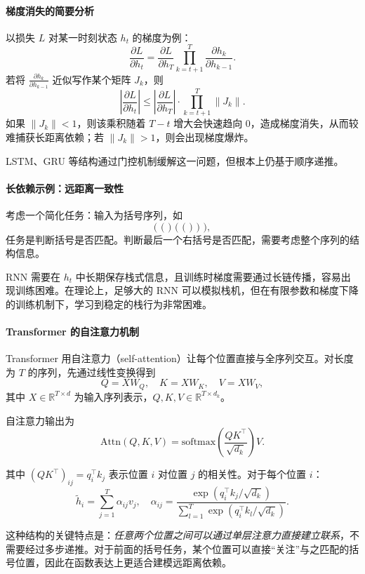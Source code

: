 \paragraph{梯度消失的简要分析}

以损失 $L$ 对某一时刻状态 $h_t$ 的梯度为例：
\[
\frac{\partial L}{\partial h_t} = \frac{\partial L}{\partial h_T} \prod_{k=t+1}^{T} \frac{\partial h_k}{\partial h_{k-1}}.
\]
若将 $\frac{\partial h_k}{\partial h_{k-1}}$ 近似写作某个矩阵 $J_k$，则
\[
\left|\frac{\partial L}{\partial h_t}\right| \le \left|\frac{\partial L}{\partial h_T}\right| \cdot \prod_{k=t+1}^{T} \|J_k\|.
\]
如果 $\|J_k\| < 1$，则该乘积随着 $T-t$ 增大会快速趋向 0，造成梯度消失，从而较难捕获长距离依赖；若 $\|J_k\| > 1$，则会出现梯度爆炸。

LSTM、GRU 等结构通过门控机制缓解这一问题，但根本上仍基于顺序递推。

\paragraph{长依赖示例：远距离一致性}

考虑一个简化任务：输入为括号序列，如
\[
\texttt{( ( ) ( ( ) ) )},
\]
任务是判断括号是否匹配。判断最后一个右括号是否匹配，需要考虑整个序列的结构信息。

RNN 需要在 $h_t$ 中长期保存栈式信息，且训练时梯度需要通过长链传播，容易出现训练困难。在理论上，足够大的 RNN 可以模拟栈机，但在有限参数和梯度下降的训练机制下，学习到稳定的栈行为非常困难。

\paragraph{Transformer 的自注意力机制}

Transformer 用自注意力（self-attention）让每个位置直接与全序列交互。对长度为 $T$ 的序列，先通过线性变换得到
\[
Q = X W_Q,\quad K = X W_K,\quad V = X W_V,
\]
其中 $X\in\mathbb{R}^{T\times d}$ 为输入序列表示，$Q,K,V\in\mathbb{R}^{T\times d_k}$。

自注意力输出为
\[
\text{Attn}(Q,K,V) = \text{softmax}\left(\frac{QK^\top}{\sqrt{d_k}}\right)V.
\]

其中 $(QK^\top)_{ij} = q_i^\top k_j$ 表示位置 $i$ 对位置 $j$ 的相关性。对于每个位置 $i$：
\[
\tilde{h}_i = \sum_{j=1}^{T} \alpha_{ij} v_j,\quad \alpha_{ij} = \frac{\exp(q_i^\top k_j / \sqrt{d_k})}{\sum_{l=1}^{T} \exp(q_i^\top k_l / \sqrt{d_k})}.
\]

这种结构的关键特点是：\emph{任意两个位置之间可以通过单层注意力直接建立联系}，不需要经过多步递推。对于前面的括号任务，某个位置可以直接“关注”与之匹配的括号位置，因此在函数表达上更适合建模远距离依赖。

